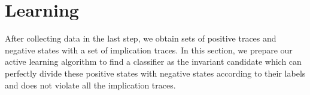 
\section{Learning} %
\label{sec:learning}

After collecting data in the last step, 
we obtain sets of positive traces and negative states with a set of implication traces. 
In this section, we prepare our active learning algorithm to find a classifier as the invariant candidate 
which can perfectly divide these positive states with negative states according to their labels
and does not violate all the implication traces.

